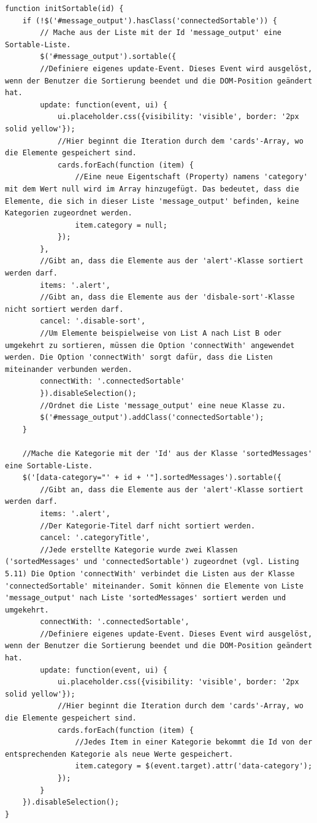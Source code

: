 \begin{lstlisting}[caption={Sortierfunktion auf der Präsentation-Seite - JavaScript}, label=lst:sortierfunktion, captionpos=b]
function initSortable(id) {
	if (!$('#message_output').hasClass('connectedSortable')) {
		// Mache aus der Liste mit der Id 'message_output' eine Sortable-Liste.
		$('#message_output').sortable({
		//Definiere eigenes update-Event. Dieses Event wird ausgelöst, wenn der Benutzer die Sortierung beendet und die DOM-Position geändert hat.
		update: function(event, ui) {
			ui.placeholder.css({visibility: 'visible', border: '2px solid yellow'});
			//Hier beginnt die Iteration durch dem 'cards'-Array, wo die Elemente gespeichert sind.
			cards.forEach(function (item) {
				//Eine neue Eigentschaft (Property) namens 'category' mit dem Wert null wird im Array hinzugefügt. Das bedeutet, dass die Elemente, die sich in dieser Liste 'message_output' befinden, keine Kategorien zugeordnet werden.
				item.category = null;
			});
		},
		//Gibt an, dass die Elemente aus der 'alert'-Klasse sortiert werden darf.
		items: '.alert',
		//Gibt an, dass die Elemente aus der 'disbale-sort'-Klasse nicht sortiert werden darf.
		cancel: '.disable-sort',
		//Um Elemente beispielweise von List A nach List B oder umgekehrt zu sortieren, müssen die Option 'connectWith' angewendet werden. Die Option 'connectWith' sorgt dafür, dass die Listen miteinander verbunden werden.
		connectWith: '.connectedSortable'
		}).disableSelection();
		//Ordnet die Liste 'message_output' eine neue Klasse zu.
		$('#message_output').addClass('connectedSortable');
	}
	
	//Mache die Kategorie mit der 'Id' aus der Klasse 'sortedMessages' eine Sortable-Liste.
	$('[data-category="' + id + '"].sortedMessages').sortable({
		//Gibt an, dass die Elemente aus der 'alert'-Klasse sortiert werden darf.
		items: '.alert',
		//Der Kategorie-Titel darf nicht sortiert werden.
		cancel: '.categoryTitle',
		//Jede erstellte Kategorie wurde zwei Klassen ('sortedMessages' und 'connectedSortable') zugeordnet (vgl. Listing  5.11) Die Option 'connectWith' verbindet die Listen aus der Klasse 'connectedSortable' miteinander. Somit können die Elemente von Liste 'message_output' nach Liste 'sortedMessages' sortiert werden und umgekehrt.
		connectWith: '.connectedSortable',
		//Definiere eigenes update-Event. Dieses Event wird ausgelöst, wenn der Benutzer die Sortierung beendet und die DOM-Position geändert hat.
		update: function(event, ui) {
			ui.placeholder.css({visibility: 'visible', border: '2px solid yellow'});
			//Hier beginnt die Iteration durch dem 'cards'-Array, wo die Elemente gespeichert sind.
			cards.forEach(function (item) {
				//Jedes Item in einer Kategorie bekommt die Id von der entsprechenden Kategorie als neue Werte gespeichert.
				item.category = $(event.target).attr('data-category');
			});
		}
	}).disableSelection();
}
\end{lstlisting}

